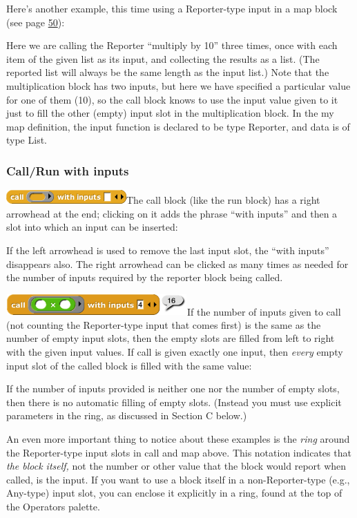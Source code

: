 Here's another example, this time using a Reporter-type input in a map
block (see page \hyperref[map]{50}):

Here we are calling the Reporter ``multiply by 10'' three times, once
with each item of the given list as its input, and collecting the
results as a list. (The reported list will always be the same length as
the input list.) Note that the multiplication block has two inputs, but
here we have specified a particular value for one of them (10), so the
call block knows to use the input value given to it just to fill the
other (empty) input slot in the multiplication block. In the my map
definition, the input function is declared to be type Reporter, and data
is of type List.

\subsubsection{Call/Run with inputs}\label{callrun-with-inputs}

\includegraphics[width=1.8125in,height=0.20833in]{media/image698.png}The
call block (like the run block) has a right arrowhead at the end;
clicking on it adds the phrase ``with inputs'' and then a slot into
which an input can be inserted:

If the left arrowhead is used to remove the last input slot, the ``with
inputs'' disappears also. The right arrowhead can be clicked as many
times as needed for the number of inputs required by the reporter block
being called.

\includegraphics[width=2.72917in,height=0.31806in]{media/image699.png}If
the number of inputs given to call (not counting the Reporter-type input
that comes first) is the same as the number of empty input slots, then
the empty slots are filled from left to right with the given input
values. If call is given exactly one input, then \emph{every} empty
input slot of the called block is filled with the same value:

If the number of inputs provided is neither one nor the number of empty
slots, then there is no automatic filling of empty slots. (Instead you
must use explicit parameters in the ring, as discussed in Section C
below.)

An even more important thing to notice about these examples is the
\emph{ring} around the Reporter-type input slots in call and map above.
This notation indicates that \emph{the block itself,} not the number or
other value that the block would report when called, is the input. If
you want to use a block itself in a non-Reporter-type (e.g., Any-type)
input slot, you can enclose it explicitly in a ring, found at the top of
the Operators palette.


